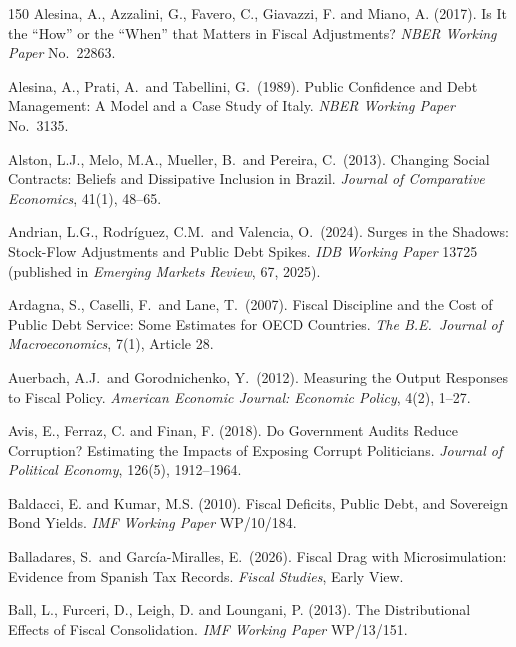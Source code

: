 \documentclass[11pt,a4paper]{article}
\begin{document}
\begin{thebibliography}{150}
 Alesina, A., Azzalini, G., Favero, C., Giavazzi, F. and Miano, A. (2017). Is It the ``How'' or the ``When'' that Matters in Fiscal Adjustments? \textit{NBER Working Paper} No.\ 22863.

 Alesina, A., Prati, A.\ and Tabellini, G.\ (1989). Public Confidence and Debt Management: A Model and a Case Study of Italy. \textit{NBER Working Paper} No.\ 3135.

 Alston, L.J., Melo, M.A., Mueller, B.\ and Pereira, C.\ (2013). Changing Social Contracts: Beliefs and Dissipative Inclusion in Brazil. \textit{Journal of Comparative Economics}, 41(1), 48--65.

 Andrian, L.G., Rodr\'iguez, C.M.\ and Valencia, O.\ (2024). Surges in the Shadows: Stock-Flow Adjustments and Public Debt Spikes. \textit{IDB Working Paper} 13725 (published in \textit{Emerging Markets Review}, 67, 2025).

 Ardagna, S., Caselli, F.\ and Lane, T.\ (2007). Fiscal Discipline and the Cost of Public Debt Service: Some Estimates for OECD Countries. \textit{The B.E.\ Journal of Macroeconomics}, 7(1), Article 28.

 Auerbach, A.J.\ and Gorodnichenko, Y.\ (2012). Measuring the Output Responses to Fiscal Policy. \textit{American Economic Journal: Economic Policy}, 4(2), 1--27.

 Avis, E., Ferraz, C. and Finan, F. (2018). Do Government Audits Reduce Corruption? Estimating the Impacts of Exposing Corrupt Politicians. \textit{Journal of Political Economy}, 126(5), 1912--1964.

 Baldacci, E. and Kumar, M.S. (2010). Fiscal Deficits, Public Debt, and Sovereign Bond Yields. \textit{IMF Working Paper} WP/10/184.

 Balladares, S.\ and Garc\'ia-Miralles, E.\ (2026). Fiscal Drag with Microsimulation: Evidence from Spanish Tax Records. \textit{Fiscal Studies}, Early View.

 Ball, L., Furceri, D., Leigh, D. and Loungani, P. (2013). The Distributional Effects of Fiscal Consolidation. \textit{IMF Working Paper} WP/13/151.


\end{thebibliography}
\end{document}
